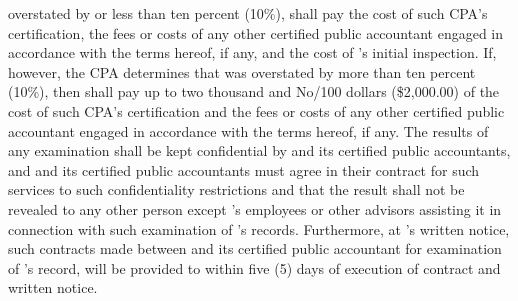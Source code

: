 overstated by or less than ten percent (10\%), \lessee shall pay the cost of such CPA's certification, the fees or costs of any other certified public accountant engaged in accordance with the terms hereof, if any, and the cost of \lessee's initial inspection. If, however, the CPA determines that \additionalRent was overstated by more than ten percent (10\%), then \lessor shall pay up to two thousand and No/100 dollars (\$2,000.00) of the cost of such CPA's certification and the fees or costs of any other certified public accountant engaged in accordance with the terms hereof, if any. The results of any examination shall be kept confidential by \lessee and its certified public accountants, and \lessee and its certified public accountants must agree in their contract for such services to such confidentiality restrictions and that the result shall not be revealed to any other person except \lessee's employees or other advisors assisting it in connection with such examination of \lessor's records. Furthermore, at \lessor's written notice, such contracts made between \lessee and its certified public accountant for examination of \lessor's record, will be provided to \lessor within five (5) days of execution of contract and written notice.
